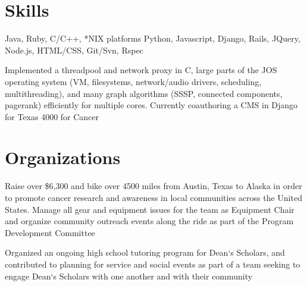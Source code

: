 \documentclass[11pt,letter,sans]{moderncv}
\begin{document}


\section{Skills}
{Java, Ruby, C/C++, *NIX platforms}
{Python, Javascript, Django, Rails, JQuery, Node.js, HTML/CSS, Git/Svn, Rspec}

{Implemented a threadpool and network proxy in C, large parts of the JOS
operating system (VM, filesystems, network/audio drivers, scheduling,
multithreading), and many graph algorithms (SSSP, connected components,
pagerank) efficiently for multiple cores. Currently coauthoring a CMS in Django
for Texas 4000 for Cancer}

\section{Organizations}
{Raise over \$6,300 and bike over 4500 miles from Austin, Texas to Alaska in
order to promote cancer research and awareness in local communities across the
United States. Manage all gear and equipment issues for the team as Equipment
Chair and organize community outreach events along the ride as part of the
Program Development Committee}

{Organized an ongoing high school tutoring program for Dean`s Scholars, and
contributed to planning for service and social events as part of a team seeking
to engage Dean`s Scholars with one another and with their community}
\end{document}
